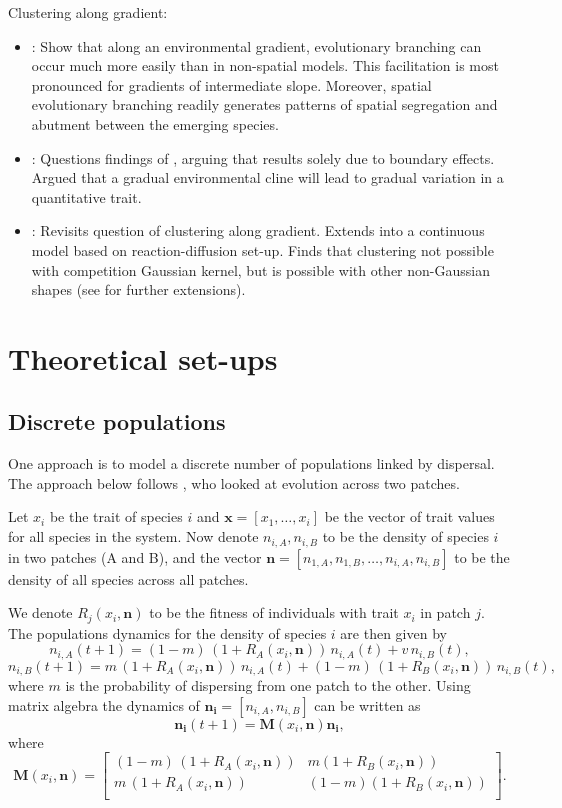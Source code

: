 \documentclass[a4paper,11pt]{article}
\begin{document}
Clustering along gradient:

\begin{itemize}
\item \citet{Doebeli-2003}: Show that along an environmental gradient, evolutionary branching can occur much more easily than in non-spatial models. This facilitation is most pronounced for gradients of intermediate slope. Moreover, spatial evolutionary branching readily generates patterns of spatial segregation and abutment between the emerging species.
\item \citet{Polechova-2005}: Questions findings of \citet{Doebeli-2003}, arguing that results solely due to boundary effects.  Argued that a gradual environmental cline will lead to gradual variation in a quantitative trait.
\item \citet{Leimar-2008}: Revisits question of clustering along gradient. Extends  \citet{Doebeli-2003} into a continuous model based on reaction-diffusion set-up. Finds that clustering not possible with competition Gaussian kernel, but is possible with other non-Gaussian shapes (see \citet{Leimar-2013} for further extensions).

\end{itemize}


\section{Theoretical set-ups}

\subsection{Discrete populations}

One approach is to model a discrete number of populations linked by dispersal. The approach below follows \citet{Pontarp-2015}, who looked at evolution across two patches.

Let $x_i$ be the trait of species $i$ and $\mathbf{x} = [x_1,\ldots, x_i]$ be the vector of trait values for all species in the system. Now denote $n_{i,A}, n_{i,B}$ to be the density of species $i$ in two patches (A and B), and the vector $\mathbf{n} = [n_{1,A}, n_{1,B}, \ldots, n_{i,A}, n_{i,B}]$ to be the density of all species across all patches.

We denote $R_j(x_i, \mathbf{n})$ to be the fitness of individuals with trait $x_i$ in patch $j$. The populations dynamics for the density of species $i$ are then given by
$$n_{i,A}(t+1) = (1-m) \,(1+R_A(x_i, \mathbf{n})) \, n_{i,A}(t) + v\, n_{i,B}(t),$$
$$n_{i,B}(t+1) = m  \, (1+R_A(x_i, \mathbf{n}))\, n_{i,A}(t) + (1-m) \,  (1+R_B(x_i, \mathbf{n})) \, n_{i,B}(t),$$
where $m$ is the probability of dispersing from one patch to the other. Using matrix algebra the dynamics of $\mathbf{n_i} = [n_{i,A}, n_{i,B}]$ can be written as
$$\mathbf{n_i}(t+1)=\mathbf{M}(x_i, \mathbf{n}) \mathbf{n_i},$$
where
$$ \mathbf{M}(x_i, \mathbf{n}) =  \left[ \begin{array}{cc}
(1-m) \,(1+R_A(x_i, \mathbf{n})) & m (1+R_B(x_i, \mathbf{n})) \\
m \,(1+R_A(x_i, \mathbf{n})) & (1-m) (1+R_B(x_i, \mathbf{n})) \\
\end{array} \right].$$
\end{document}
